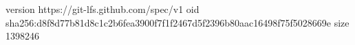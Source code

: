 version https://git-lfs.github.com/spec/v1
oid sha256:d8f8d77b81d8c1c2b6fea3900f7f1f2467d5f2396b80aac16498f75f5028669e
size 1398246
